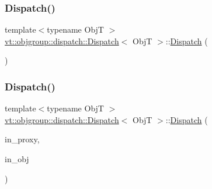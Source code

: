 \mbox{\label{structvt_1_1objgroup_1_1dispatch_1_1_dispatch_a8287e333b342d531f508a81281a164eb}} 
\subsubsection{\texorpdfstring{Dispatch()}{Dispatch()}\hspace{0.1cm}{\footnotesize\ttfamily [3/4]}}
{\footnotesize\ttfamily template$<$typename ObjT $>$ \\
\hyperlink{structvt_1_1objgroup_1_1dispatch_1_1_dispatch}{vt\+::objgroup\+::dispatch\+::\+Dispatch}$<$ ObjT $>$\+::\hyperlink{structvt_1_1objgroup_1_1dispatch_1_1_dispatch}{Dispatch} (\begin{DoxyParamCaption}\item[{\hyperlink{structvt_1_1objgroup_1_1dispatch_1_1_dispatch}{Dispatch}$<$ ObjT $>$ \&\&}]{ }\end{DoxyParamCaption})\hspace{0.3cm}{\ttfamily [default]}}

\mbox{\label{structvt_1_1objgroup_1_1dispatch_1_1_dispatch_a61f23161c507dc49e91a12f1592a1e5e}} 
\subsubsection{\texorpdfstring{Dispatch()}{Dispatch()}\hspace{0.1cm}{\footnotesize\ttfamily [4/4]}}
{\footnotesize\ttfamily template$<$typename ObjT $>$ \\
\hyperlink{structvt_1_1objgroup_1_1dispatch_1_1_dispatch}{vt\+::objgroup\+::dispatch\+::\+Dispatch}$<$ ObjT $>$\+::\hyperlink{structvt_1_1objgroup_1_1dispatch_1_1_dispatch}{Dispatch} (\begin{DoxyParamCaption}\item[{\hyperlink{namespacevt_ad7cae989df485fccca57f0792a880a8e}{Obj\+Group\+Proxy\+Type}}]{in\+\_\+proxy,  }\item[{ObjT $\ast$}]{in\+\_\+obj }\end{DoxyParamCaption})\hspace{0.3cm}{\ttfamily [inline]}}

